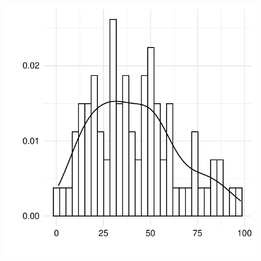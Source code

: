\documentclass[
  letterpaper,
]{latex/krantz}
\theoremstyle{definition}
\theoremstyle{remark}
\begin{document}
\begin{figure}[H]
\begin{minipage}{0.33\linewidth}
{\includegraphics{part_2/3_analysis_files/figure-pdf/fig-aa-belc-histograms-2.pdf}

}


\end{minipage}%
%
\begin{minipage}{0.33\linewidth}

\end{minipage}
\end{figure}
\end{document}
